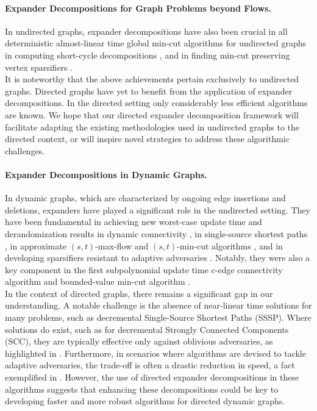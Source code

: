 \documentclass[11pt]{article}
\begin{document}
\paragraph{Expander Decompositions for Graph Problems beyond Flows.} In undirected graphs, expander decompositions have also been crucial in all deterministic almost-linear time global min-cut algorithms for undirected graphs \cite{kawarabayashi2018deterministic,saranurak2021simple,li2021deterministic} in computing short-cycle decompositions \cite{chu2020graph,parter2019optimal,liu2019short}, and in finding min-cut preserving vertex sparsifiers \cite{chalermsook2021vertex,liu2020vertex}.\\
It is noteworthy that the above achievements pertain exclusively to undirected graphs. Directed graphs have yet to benefit from the application of expander decompositions.
In the directed setting only considerably less efficient algorithms are known. We hope that our directed expander decomposition framework will facilitate adapting the existing methodologies used in undirected graphs to the directed context, or will inspire novel strategies to address these algorithmic challenges.


\paragraph{Expander Decompositions in Dynamic Graphs.} 
In dynamic graphs, which are characterized by ongoing edge insertions and deletions, expanders have played a significant role in the undirected setting. They have been fundamental in achieving new worst-case update time and derandomization results in dynamic connectivity \cite{wulff2017fully,nanongkai2017dynamic,nanongkai2017dynamicMinimum,chuzhoy2020deterministic}, in single-source shortest paths \cite{chuzhoy2019new,bernstein2020deterministic,chuzhoy2021deterministic,chuzhoy2021decremental,bernstein2022deterministic}, in approximate $(s, t)$-max-flow and $(s,t)$-min-cut algorithms \cite{goranci2021expander}, and in developing sparsifiers resistant to adaptive adversaries \cite{bernstein2020fully, chen2022maximum}. Notably, they were also a key component in the first subpolynomial update time c-edge connectivity algorithm \cite{jin2022fully} and bounded-value min-cut algorithm \cite{jin2024fully}.\\
In the context of directed graphs, there remains a significant gap in our understanding. A notable challenge is the absence of near-linear time solutions for many problems, such as decremental Single-Source Shortest Paths (SSSP). Where solutions do exist, such as for decremental Strongly Connected Components (SCC), they are typically effective only against oblivious adversaries, as highlighted in \cite{bernstein2019decremental}. Furthermore, in scenarios where algorithms are devised to tackle adaptive adversaries, the trade-off is often a drastic reduction in speed, a fact exemplified in \cite{bernstein2020deterministic}. However, the use of directed expander decompositions in these algorithms suggests that enhancing these decompositions could be key to developing faster and more robust algorithms for directed dynamic graphs.
 
\end{document}
